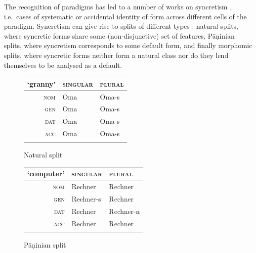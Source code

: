 \documentclass[output=paper
 	        ,biblatex
                ,babelshorthands
                ,newtxmath
                ,draftmode
                ,colorlinks, citecolor=brown
]{langscibook}
\begin{document}
The recognition of paradigms has led to a number of works on
syncretism \citep[see, e.g.][]{Baerman05}, i.e.\ cases of systematic or
accidental identity of form across different cells of the
paradigm. Syncretism can give rise to splits of different types
\citep{Corbett15}: natural splits, where syncretic forms share some
(non-disjunctive) set of features, Pāṇinian splits, where syncretism
corresponds to some default form, and finally morphomic splits, where
syncretic forms neither form a natural class nor do they lend
themselves to be analysed as a default. 

\begin{table}[htb]
  \centering
  
  \begin{subfigure}{.45\textwidth}
    
    \centering
    \begin{tabular}{r|ll}
      \lsptoprule
      `granny' & \textsc{singular} & \textsc{plural}\\
      \midrule
      \textsc{nom} & Oma & Oma-s\\
      \textsc{gen} & Oma & Oma-s\\
      \textsc{dat} & Oma & Oma-s\\
      \textsc{acc} & Oma & Oma-s\\
      \lspbottomrule
    \end{tabular}

    \caption{Natural split}
  \end{subfigure}  
  \begin{subfigure}{.50\textwidth}
    
    \centering
    \begin{tabular}{r|ll}
      \lsptoprule
      `computer' & \textsc{singular} & \textsc{plural}\\
      \midrule
      \textsc{nom} & Rechner & Rechner\\
      \textsc{gen} & Rechner-s & Rechner\\
      \textsc{dat} & Rechner & Rechner-n\\
      \textsc{acc} & Rechner & Rechner\\
      \lspbottomrule
    \end{tabular}
    \caption{Pāṇinian split}
  \end{subfigure}

  \begin{subfigure}{.45\textwidth}
    \centering


\end{subfigure}
\end{table}
\end{document}
